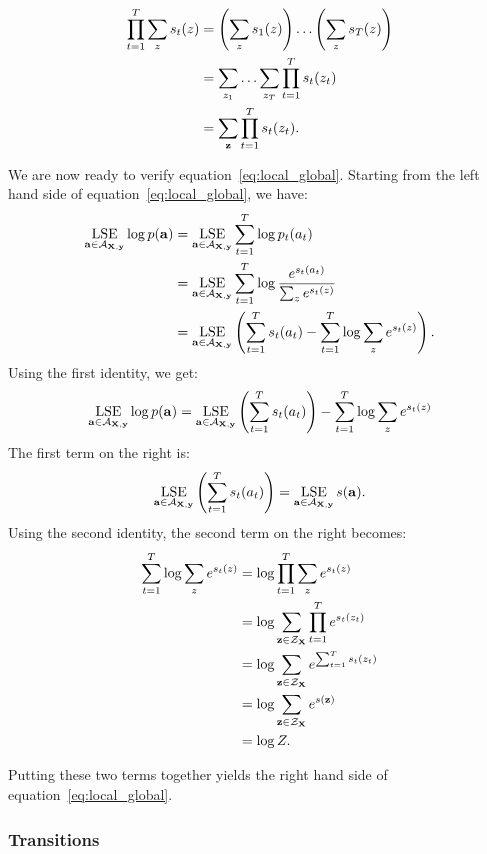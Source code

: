 \begin{tcolorbox}[breakable, colback=white!95!black, colframe=white!45!black,
    sharp corners=all, title=Global or Local Normalization]
\begin{align*}
\prod_{t=1}^T \sum_{z} s_t(z) &= \left(\sum_{z} s_1(z)\right) \ldots \left(\sum_{z} s_T(z)\right) \\
&= \sum_{z_1} \ldots \sum_{z_T} \prod_{t=1}^T s_t(z_t) \\
&= \sum_{{\bf z}}\prod_{t=1}^T s_t(z_t).
\end{align*}

We are now ready to verify equation~\ref{eq:local_global}. Starting from the
left hand side of equation~\ref{eq:local_global}, we have:
\begin{align*}
\operatorname*{\textrm{LSE}}_{{\bf a} \in \mathcal{A}_{{\bf X}, {\bf y}}} \log p({\bf a}) &= \operatorname*{\textrm{LSE}}_{{\bf a} \in \mathcal{A}_{{\bf X}, {\bf y}}} \sum_{t=1}^T \log p_t(a_t) \\
&= \operatorname*{\textrm{LSE}}_{{\bf a} \in \mathcal{A}_{{\bf X}, {\bf y}}} \sum_{t=1}^T \log \frac{e^{s_t(a_t)}}{\sum_z e^{s_t(z)}} \\
&= \operatorname*{\textrm{LSE}}_{{\bf a} \in \mathcal{A}_{{\bf X}, {\bf y}}} \left( \sum_{t=1}^T s_t(a_t) - \sum_{t=1}^T \log \sum_z e^{s_t(z)} \right).\\
\end{align*}
Using the first identity, we get:
\begin{align*}
\operatorname*{\textrm{LSE}}_{{\bf a} \in \mathcal{A}_{{\bf X}, {\bf y}}} \log p({\bf a}) &= \operatorname*{\textrm{LSE}}_{{\bf a} \in \mathcal{A}_{{\bf X}, {\bf y}}} \left( \sum_{t=1}^T s_t(a_t)\right) - \sum_{t=1}^T \log \sum_z e^{s_t(z)} \\
\end{align*}
The first term on the right is:
$$
\operatorname*{\textrm{LSE}}_{{\bf a} \in \mathcal{A}_{{\bf X}, {\bf y}}} \left( \sum_{t=1}^T s_t(a_t)\right) = \operatorname*{\textrm{LSE}}_{{\bf a} \in \mathcal{A}_{{\bf X}, {\bf y}}} s({\bf a}).
$$
Using the second identity, the second term on the right becomes:
\begin{align*}
\sum_{t=1}^T \log \sum_z e^{s_t(z)} &= \log \prod_{t=1}^T \sum_z e^{s_t(z)} \\
&= \log \sum_{{\bf z} \in \mathcal{\mathcal{Z}_{\bf X}}} \prod_{t=1}^T e^{s_t(z_t)} \\
&= \log \sum_{{\bf z} \in \mathcal{\mathcal{Z}_{\bf X}}} e^{\sum_{t=1}^T s_t(z_t)} \\
&= \log \sum_{{\bf z} \in \mathcal{\mathcal{Z}_{\bf X}}} e^{s({\bf z})} \\
&= \log Z.
\end{align*}

Putting these two terms together yields the right hand side of
equation~\ref{eq:local_global}.
\end{tcolorbox}

\subsubsection{Transitions}

